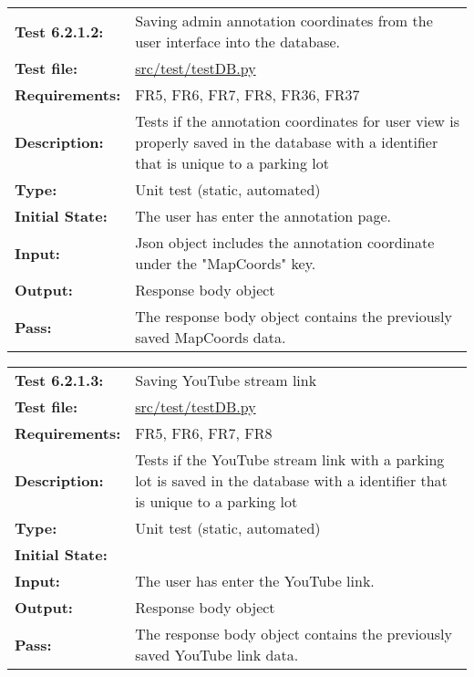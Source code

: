 \documentclass[12pt, titlepage]{article}
\begin{document}
\textcolor{red}{
\begin{center}
\begin{tabular}{|l|p{10cm}|}
    \hline
    \bf{Test} 6.2.1.2: & Saving admin annotation coordinates from the user
    interface into the database. \\
     \bf{Test file: } &
     \href{https://github.com/parkd-app/park-d/blob/main/test/TestDB.py}{src/test/testDB.py}\\
    \bf{Requirements}: & FR5, FR6, FR7, FR8, FR36, FR37  \\
    \bf{Description}: & Tests if the annotation coordinates for user view is
    properly saved in the database with a identifier that is unique to a parking
    lot\\
    \bf{Type}: & Unit test (static, automated) \\
    \bf{Initial State}: & The user has enter the annotation page. \\
    \bf{Input}: & Json object includes the annotation coordinate under the
    "MapCoords" key. \\
    \bf{Output}: & Response body object \\
    \bf{Pass}: & The response body object contains the previously saved
    MapCoords data. \\
    \hline
\end{tabular}
\end{center}}


\vspace*{0.5 cm}


\textcolor{red}{
\begin{center}
\begin{tabular}{|l|p{10cm}|}
    \hline
    \bf{Test} 6.2.1.3: & Saving YouTube stream link \\
     \bf{Test file: } &
     \href{https://github.com/parkd-app/park-d/blob/main/test/TestDB.py}{src/test/testDB.py}\\
    \bf{Requirements}: & FR5, FR6, FR7, FR8 \\
    \bf{Description}: & Tests if the YouTube stream link with a parking lot is
    saved in the database with a identifier that is unique to a parking lot\\
    \bf{Type}: & Unit test (static, automated) \\
    \bf{Initial State}: &  \\
    \bf{Input}: & The user has enter the YouTube link. \\
    \bf{Output}: & Response body object \\
    \bf{Pass}: & The response body object contains the previously saved YouTube
    link data. \\
    \hline
\end{tabular}
\end{center}}
\end{document}
